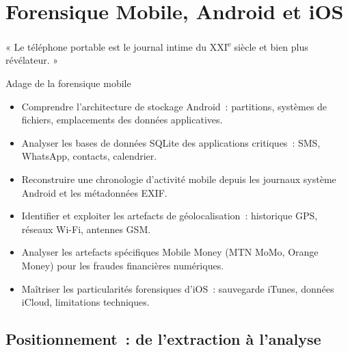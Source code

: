 
\chapter{Forensique Mobile, Android et iOS}
\label{chap:for-mob}

\epigraph{%
    « Le téléphone portable est le journal intime du XXI\textsuperscript{e}
    siècle et bien plus révélateur. »%
}{Adage de la forensique mobile}


\begin{boxobjectifs}
\begin{itemize}
    \item Comprendre l'architecture de stockage Android~: partitions,
          systèmes de fichiers, emplacements des données applicatives.
    \item Analyser les bases de données SQLite des applications
          critiques~: SMS, WhatsApp, contacts, calendrier.
    \item Reconstruire une chronologie d'activité mobile depuis
          les journaux système Android et les métadonnées EXIF.
    \item Identifier et exploiter les artefacts de géolocalisation~:
          historique GPS, réseaux Wi-Fi, antennes GSM.
    \item Analyser les artefacts spécifiques Mobile Money (MTN MoMo,
          Orange Money) pour les fraudes financières numériques.
    \item Maîtriser les particularités forensiques d'iOS~: sauvegarde
          iTunes, données iCloud, limitations techniques.
\end{itemize}
\end{boxobjectifs}

\bigskip

\section*{Positionnement~: de l'extraction à l'analyse}

